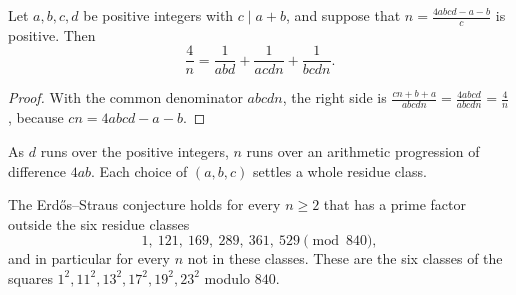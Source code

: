 \begin{lemma}\label{conjectures:lem:typeI}
Let $a,b,c,d$ be positive integers with $c\mid a+b$, and suppose that $n=\frac{4abcd-a-b}c$ is positive. Then
\[
\frac4n=\frac1{abd}+\frac1{acdn}+\frac1{bcdn}.
\]
\end{lemma}
\begin{proof}
With the common denominator $abcdn$, the right side is $\frac{cn+b+a}{abcdn}=\frac{4abcd}{abcdn}=\frac4n$, because $cn=4abcd-a-b$.
\end{proof}

As $d$ runs over the positive integers, $n$ runs over an arithmetic progression of difference $4ab$. Each choice of $(a,b,c)$ settles a whole residue
class.

\begin{theorem}[Mordell]\label{conjectures:thm:mordell}
The Erd\H os--Straus conjecture holds for every $n\ge2$ that has a prime factor outside the six residue classes
\[
1,\ 121,\ 169,\ 289,\ 361,\ 529\pmod{840},
\]
and in particular for every $n$ not in these classes. These are the six classes of the squares $1^2,11^2,13^2,17^2,19^2,23^2$ modulo $840$.
\end{theorem}
